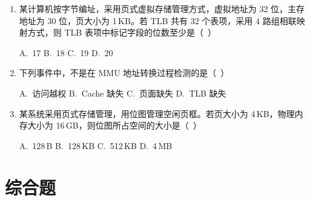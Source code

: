 \documentclass[12pt,a4paper]{ctexart}
\begin{document}
\begin{enumerate}[leftmargin=*]
D.~Cache--主存层次可采用直接映射，主存--外存层次通常采用直接映射

\item 某计算机按字节编址，采用页式虚拟存储管理方式，虚拟地址为 32 位，主存地址为 30 位，页大小为 1\,KB。若 TLB 共有 32 个表项，采用 4 路组相联映射方式，则 TLB 表项中标记字段的位数至少是（~）

A.~17 \quad B.~18 \quad C.~19 \quad D.~20

\item 下列事件中，不是在 MMU 地址转换过程检测的是（~）

A.~访问越权 \quad B.~Cache 缺失 \quad C.~页面缺失 \quad D.~TLB 缺失

\item 某系统采用页式存储管理，用位图管理空闲页框。若页大小为 4\,KB，物理内存大小为 16\,GB，则位图所占空间的大小是（~）

A.~128\,B \quad B.~128\,KB \quad C.~512\,KB \quad D.~4\,MB

\end{enumerate}

\newpage

\section{综合题}
\end{document}
